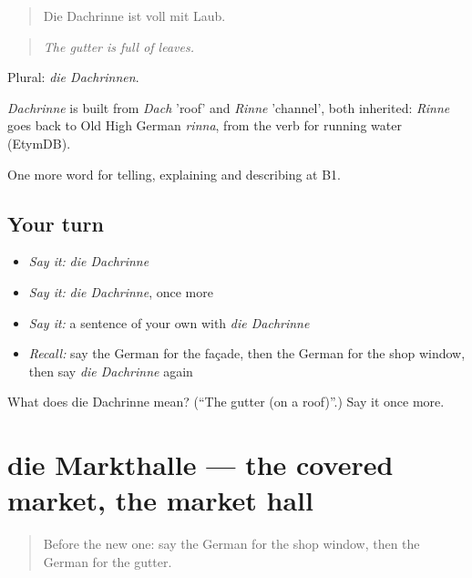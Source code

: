 \begin{quote}
Die Dachrinne ist voll mit Laub.
\end{quote}

\begin{quote}
\emph{The gutter is full of leaves.}
\end{quote}

Plural: \emph{die Dachrinnen}.

\begin{cousinweb}
\emph{Dachrinne} is built from \emph{Dach} 'roof' and \emph{Rinne} 'channel', both inherited: \emph{Rinne} goes back to Old High German \emph{rinna}, from the verb for running water (EtymDB).
\end{cousinweb}

\begin{grammarlens}[title={What you've built}]
One more word for telling, explaining and describing at B1.
\end{grammarlens}

\subsection*{Your turn}
\begin{itemize}
\raggedright
  \item \emph{Say it:} \emph{die Dachrinne}
  \item \emph{Say it:} \emph{die Dachrinne}, once more
  \item \emph{Say it:} a sentence of your own with \emph{die Dachrinne}
  \item \emph{Recall:} say the German for the façade, then the German for the shop window, then say \emph{die Dachrinne} again
\end{itemize}

\begin{tcolorbox}[breakable,colback=teal!4,colframe=teal!35!black,title={Before you move on}]
What does die Dachrinne mean? (\textquotedblleft{}The gutter (on a roof)\textquotedblright{}.) Say it once more.
\end{tcolorbox}
\section[die Markthalle]{die Markthalle — the covered market, the market hall}

\label{lesson:GE-C441-markthalle}



\begin{quote}
Before the new one: say the German for the shop window, then the German for the gutter.
\end{quote}


